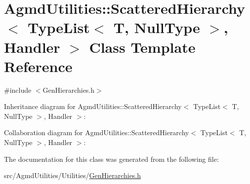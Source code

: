 \hypertarget{class_agmd_utilities_1_1_scattered_hierarchy_3_01_type_list_3_01_t_00_01_null_type_01_4_00_01_handler_01_4}{\section{Agmd\+Utilities\+:\+:Scattered\+Hierarchy$<$ Type\+List$<$ T, Null\+Type $>$, Handler $>$ Class Template Reference}
\label{class_agmd_utilities_1_1_scattered_hierarchy_3_01_type_list_3_01_t_00_01_null_type_01_4_00_01_handler_01_4}
}


{\ttfamily \#include $<$Gen\+Hierarchies.\+h$>$}



Inheritance diagram for Agmd\+Utilities\+:\+:Scattered\+Hierarchy$<$ Type\+List$<$ T, Null\+Type $>$, Handler $>$\+:


Collaboration diagram for Agmd\+Utilities\+:\+:Scattered\+Hierarchy$<$ Type\+List$<$ T, Null\+Type $>$, Handler $>$\+:


The documentation for this class was generated from the following file\+:\begin{DoxyCompactItemize}
\item 
src/\+Agmd\+Utilities/\+Utilities/\hyperlink{_gen_hierarchies_8h}{Gen\+Hierarchies.\+h}\end{DoxyCompactItemize}
